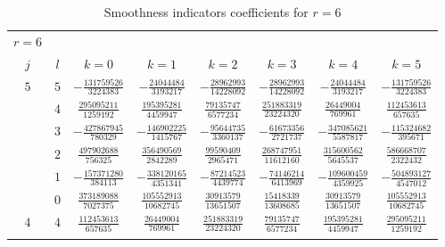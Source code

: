 \begin{table}
  \begin{center}
    \caption{Smoothness indicators coefficients for $r=6$}
    \label{tab:IS_6}
    \begin{tabular}{cccccccc}
      \toprule
      $r=6$  \\
      $j$  &  $l$  &  $k=0$                           &  $k=1$                           &  $k=2$                           &  $k=3$                           &  $k=4$                           &  $k=5$                           \\ \addlinespace
      $5$  &  $5$  &  $-\frac{ 131759526}{ 3224383}$  &  $-\frac{  24044484}{ 3193217}$  &  $-\frac{  28962993}{14228092}$  &  $-\frac{  28962993}{14228092}$  &  $-\frac{  24044484}{ 3193217}$  &  $-\frac{ 131759526}{ 3224383}$  \\ \addlinespace
           &  $4$  &  $ \frac{ 295095211}{ 1259192}$  &  $ \frac{ 195395281}{ 4459947}$  &  $ \frac{  79135747}{ 6577234}$  &  $ \frac{ 251883319}{23224320}$  &  $ \frac{  26449004}{  769961}$  &  $ \frac{ 112453613}{  657635}$  \\ \addlinespace
           &  $3$  &  $-\frac{ 427867945}{  780329}$  &  $-\frac{ 146902225}{ 1415767}$  &  $-\frac{  95644735}{ 3360137}$  &  $-\frac{  61673356}{ 2721737}$  &  $-\frac{ 347085621}{ 5587817}$  &  $-\frac{ 115324682}{  395671}$  \\ \addlinespace
           &  $2$  &  $ \frac{ 497902688}{  756325}$  &  $ \frac{ 356490569}{ 2842289}$  &  $ \frac{  99590409}{ 2965471}$  &  $ \frac{ 268747951}{11612160}$  &  $ \frac{ 315600562}{ 5645537}$  &  $ \frac{ 586668707}{ 2322432}$  \\ \addlinespace
           &  $1$  &  $-\frac{ 157371280}{  384113}$  &  $-\frac{ 338120165}{ 4351341}$  &  $-\frac{  87214523}{ 4439774}$  &  $-\frac{  74146214}{ 6413969}$  &  $-\frac{ 109600459}{ 4359925}$  &  $-\frac{ 504893127}{ 4547012}$  \\ \addlinespace
           &  $0$  &  $ \frac{ 373189088}{ 7027375}$  &  $ \frac{ 105552913}{10682745}$  &  $ \frac{  30913579}{13651507}$  &  $ \frac{  15418339}{13608685}$  &  $ \frac{  30913579}{13651507}$  &  $ \frac{ 105552913}{10682745}$  \\ \addlinespace
      $4$  &  $4$  &  $ \frac{ 112453613}{  657635}$  &  $ \frac{  26449004}{  769961}$  &  $ \frac{ 251883319}{23224320}$  &  $ \frac{  79135747}{ 6577234}$  &  $ \frac{ 195395281}{ 4459947}$  &  $ \frac{ 295095211}{ 1259192}$  \\ \addlinespace

\end{tabular}
\end{center}
\end{table}
